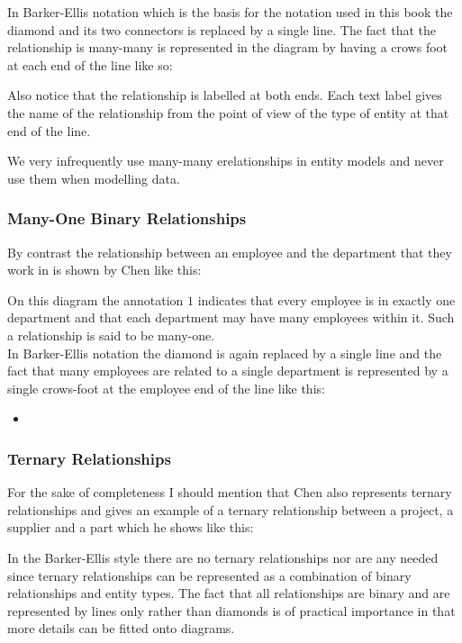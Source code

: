 \noindent In Barker-Ellis notation which is the basis for the notation used in this book the diamond and its two connectors is replaced by a single line. The fact that the relationship is many-many is represented in the diagram by having a crows foot at each end of the line like so:


\begin{center}

\end{center}

\noindent Also notice that the relationship is labelled at both ends. Each text label gives the name of the relationship from the point of view of the type of entity at that end of the line.

\noindent We very infrequently use many-many erelationships in entity models and never use them when modelling data. 

\subsubsection*{Many-One Binary Relationships}
By contrast the relationship between an employee and the department that they work in is shown by Chen like this:
\begin{center}

\end{center}

\noindent On this diagram the annotation $1$ indicates that every employee is in exactly one department and that each department may have many employees within it. Such a relationship is said to be 
many-one. \\

\noindent In Barker-Ellis notation the diamond is again replaced by a single line and the fact that many employees are related to a single department is represented by a single crows-foot at the employee end of the line like this:
\begin{center}

\begin{itemize}
	\item 
\end{itemize}
\end{center}


\subsubsection*{Ternary Relationships}
For the sake of completeness I should mention that Chen also represents ternary relationships and gives an 
example of a ternary relationship between a project, a supplier and a part which he shows like this:
\begin{center}

\end{center}

In the Barker-Ellis style there are no ternary relationships nor are any needed since ternary relationships can be represented as a combination of binary relationships and entity types. The fact that all relationships are binary and are represented by lines only rather than diamonds  is of practical importance in that more details can be fitted onto diagrams.